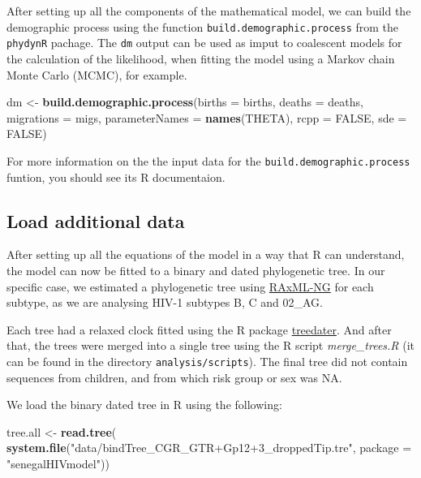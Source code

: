 \documentclass[12pt,]{article}
\newenvironment{Shaded}{\begin{snugshade}}{\end{snugshade}}
\newcommand{\DataTypeTok}[1]{\textcolor[rgb]{0.13,0.29,0.53}{#1}}
\newcommand{\KeywordTok}[1]{\textcolor[rgb]{0.13,0.29,0.53}{\textbf{#1}}}
\newcommand{\NormalTok}[1]{#1}
\newcommand{\OtherTok}[1]{\textcolor[rgb]{0.56,0.35,0.01}{#1}}
\newcommand{\StringTok}[1]{\textcolor[rgb]{0.31,0.60,0.02}{#1}}
\begin{document}
After setting up all the components of the mathematical model, we can
build the demographic process using the function
\texttt{build.demographic.process} from the \texttt{phydynR} pachage.
The \texttt{dm} output can be used as imput to coalescent models for the
calculation of the likelihood, when fitting the model using a Markov
chain Monte Carlo (MCMC), for example.

\begin{Shaded}
\begin{Highlighting}[]
\NormalTok{dm <-}\StringTok{ }\KeywordTok{build.demographic.process}\NormalTok{(}\DataTypeTok{births =}\NormalTok{ births,}
                                \DataTypeTok{deaths =}\NormalTok{ deaths,}
                                \DataTypeTok{migrations =}\NormalTok{ migs,}
                                \DataTypeTok{parameterNames =} \KeywordTok{names}\NormalTok{(THETA),}
                                \DataTypeTok{rcpp =} \OtherTok{FALSE}\NormalTok{,}
                                \DataTypeTok{sde =} \OtherTok{FALSE}\NormalTok{)}
\end{Highlighting}
\end{Shaded}

For more information on the the input data for the
\texttt{build.demographic.process} funtion, you should see its R
documentaion.

\hypertarget{load-additional-data}{%
\subsection{Load additional data}\label{load-additional-data}}

After setting up all the equations of the model in a way that R can
understand, the model can now be fitted to a binary and dated
phylogenetic tree. In our specific case, we estimated a phylogenetic
tree using \href{https://github.com/amkozlov/raxml-ng}{RAxML-NG} for
each subtype, as we are analysing HIV-1 subtypes B, C and 02\_AG.

Each tree had a relaxed clock fitted using the R package
\href{https://github.com/emvolz/treedater}{treedater}. And after that,
the trees were merged into a single tree using the R script
\emph{merge\_trees.R} (it can be found in the directory
\texttt{analysis/scripts}). The final tree did not contain sequences
from children, and from which risk group or sex was NA.

We load the binary dated tree in R using the following:

\begin{Shaded}
\begin{Highlighting}[]
\NormalTok{tree.all <-}\StringTok{ }\KeywordTok{read.tree}\NormalTok{(}
  \KeywordTok{system.file}\NormalTok{(}\StringTok{"data/bindTree_CGR_GTR+Gp12+3_droppedTip.tre"}\NormalTok{, }
  \DataTypeTok{package =} \StringTok{"senegalHIVmodel"}\NormalTok{))}
\end{Highlighting}
\end{Shaded}
\end{document}
